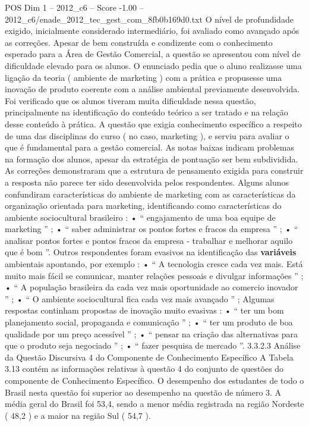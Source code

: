 \begin{textsample}{POS Dim 1 – 2012\_c6 – Score -1.00 – 2012\_c6/enade\_2012\_tec\_gest\_com\_8fb0b169d0.txt}
O nível de profundidade exigido, inicialmente considerado intermediário, foi avaliado como avançado após as correções.
Apesar de bem construída e condizente com o conhecimento esperado para a Área de Gestão Comercial, a questão se apresentou com nível de dificuldade elevado para os alunos.
O enunciado pedia que o aluno realizasse uma ligação da teoria ( ambiente de marketing ) com a prática e propusesse uma inovação de produto coerente com a análise ambiental previamente desenvolvida.
Foi verificado que os alunos tiveram muita dificuldade nessa questão, principalmente na identificação do conteúdo teórico a ser tratado e na relação desse conteúdo à prática.
A questão que exigia conhecimento específico a respeito de uma das disciplinas do curso ( no caso, marketing ), e serviu para avaliar o que é fundamental para a gestão comercial.
As notas baixas indicam problemas na formação dos alunos, apesar da estratégia de pontuação ser bem subdividida.
As correções demonstraram que a estrutura de pensamento exigida para construir a resposta não parece ter sido desenvolvida pelos respondentes.
Alguns alunos confundiram características do ambiente de marketing com as características da organização orientada para marketing, identificando como características do ambiente sociocultural brasileiro : • “ engajamento de uma boa equipe de marketing ” ; • “ saber administrar os pontos fortes e fracos da empresa ” ; • “ analisar pontos fortes e pontos fracos da empresa - trabalhar e melhorar aquilo que é bom ”.
Outros respondentes foram evasivos na identificação das \textbf{variáveis} ambientais apontando, por exemplo : • “ A tecnologia cresce cada vez mais.
Está muito mais fácil se comunicar, manter relações pessoais e divulgar informações ” ; • “ A população brasileira da cada vez mais oportunidade ao comercio inovador ” ; • “ O ambiente sociocultural fica cada vez mais avançado ” ; Algumas respostas continham propostas de inovação muito evasivas : • “ ter um bom planejamento social, propaganda e comunicação ” ; • “ ter um produto de boa qualidade por um preço acessível ” ; • “ pensar na criação das alternativas para que o produto seja negociado ” ; • “ fazer pesquisa de mercado ”. 3.3.2.3 Análise da Questão Discursiva 4 do Componente de Conhecimento Específico A Tabela 3.13 contém as informações relativas à questão 4 do conjunto de questões do componente de Conhecimento Específico.
O desempenho dos estudantes de todo o Brasil nesta questão foi superior ao desempenho na questão de número 3.
A média geral do Brasil foi 53,4, sendo a menor média registrada na região Nordeste ( 48,2 ) e a maior na região Sul ( 54,7 ).

\end{textsample}
